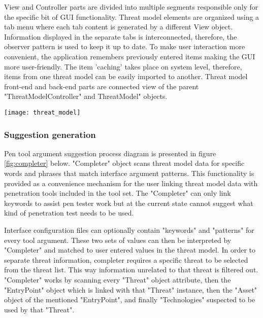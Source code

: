 View and Controller parts are divided into multiple segments responsible only for the specific bit of GUI functionality. Threat model elements are organized using a tab menu where each tab content is generated by a different View object. Information displayed in the separate tabs is interconnected, therefore, the observer pattern is used to keep it up to date. To make user interaction more convenient, the application remembers previously entered items making the GUI more user-friendly. The item 'caching' takes place on system level, therefore, items from one threat model can be easily imported to another. Threat model front-end and back-end parts are connected view of the parent "ThreatModelController" and ThreatModel" objects.

\begin{center}
	\begin{sideways}%
		\begin{minipage}{\textheight}
			\texttt{[image: threat\_model]}
			\label{fig:threat-model-struct}
		\end{minipage}
	\end{sideways}
\end{center}

\subsubsection{Suggestion generation}
Pen tool argument suggestion process diagram is presented in figure \ref{fig:completer} below.\newline
"Completer" object scans threat model data for specific words and phrases that match interface argument patterns. This functionality is provided as a convenience mechanism for the user linking threat model data with penetration tools included in the tool set. The "Completer" can only link keywords to assist pen tester work but at the current state cannot suggest what kind of penetration test needs to be used.

Interface configuration files can optionally contain "keywords" and "patterns" for every tool argument. These two sets of values can then be interpreted by "Completer" and matched to user entered values in the threat model. In order to separate threat information, completer requires a specific threat to be selected from the threat list. This way information unrelated to that threat is filtered out. "Completer" works by scanning every "Threat" object attribute, then the "EntryPoint" object which is linked with that "Threat" instance, then the "Asset" object of the mentioned "EntryPoint", and finally "Technologies" suspected to be used by that "Threat".

